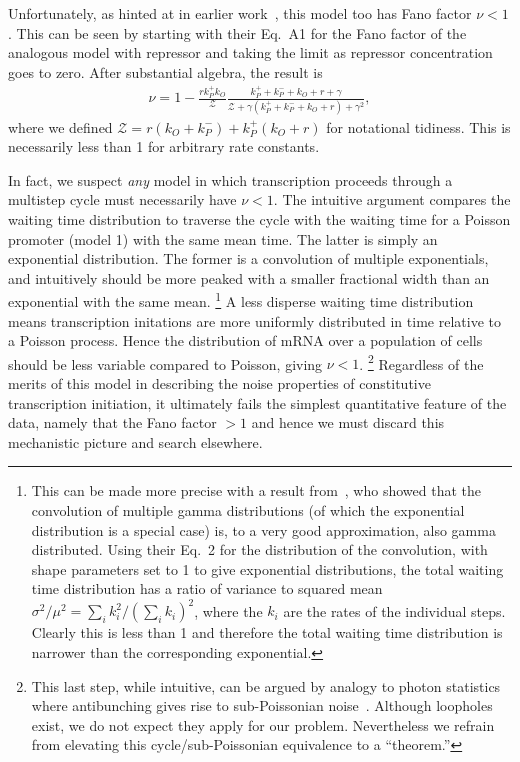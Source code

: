 Unfortunately, as hinted at in earlier work~\cite{Mitarai2015}, this model too
has Fano factor $\nu<1$. This can be seen by starting with their Eq.~A1 for the
Fano factor of the analogous model with repressor and taking the limit as
repressor concentration goes to zero. After substantial algebra, the result is
\begin{align}
\nu = 1 - \frac{r k_P^+ k_O}{\mathcal{Z}}
\frac{k_P^+ + k_P^- + k_O + r + \gamma}
    {\mathcal{Z} + \gamma(k_P^+ + k_P^- + k_O + r) + \gamma^2},
\label{eq:model3_fano}
\end{align}
where we defined $\mathcal{Z} = r(k_O + k_P^-) + k_P^+(k_O + r)$ for notational
tidiness. This is necessarily less than 1 for arbitrary rate constants.

In fact, we suspect \textit{any} model in which transcription proceeds through a
multistep cycle must necessarily have $\nu<1$. The intuitive argument compares
the waiting time distribution to traverse the cycle with the waiting time for a
Poisson promoter (model 1) with the same mean time. The latter is simply an
exponential distribution. The former is a convolution of multiple exponentials,
and intuitively should be more peaked with a smaller fractional width than an
exponential with the same mean.
\footnote{This can be made more precise with a result from~\cite{Stewart2007},
who showed that the convolution of multiple gamma distributions (of which the
exponential distribution is a special case) is, to a very good approximation,
also gamma distributed. Using their Eq.~2 for the distribution of the
convolution, with shape parameters set to 1 to give exponential distributions,
the total waiting time distribution has a ratio of variance to squared mean
$\sigma^2/\mu^2 = \sum_i k_i^2/\left(\sum_i k_i\right)^2$, where the $k_i$ are
the rates of the individual steps. Clearly this is less than 1 and therefore the
total waiting time distribution is narrower than the corresponding exponential.}
A less disperse waiting time distribution means transcription initations are
more uniformly distributed in time relative to a Poisson process. Hence the
distribution of mRNA over a population of cells should be less variable compared
to Poisson, giving $\nu<1$.
\footnote{This last step, while intuitive, can be argued by analogy to photon
statistics where antibunching gives rise to sub-Poissonian noise~\cite{Paul1982,
Zou1990}. Although loopholes exist, we do not expect they apply for our problem.
Nevertheless we refrain from elevating this cycle/sub-Poissonian equivalence to
a ``theorem.'' }
Regardless of the merits of this model in describing the noise properties of
constitutive transcription initiation, it ultimately fails the simplest
quantitative feature of the data, namely that the Fano factor $> 1$ and hence
we must discard this mechanistic picture and search elsewhere.

